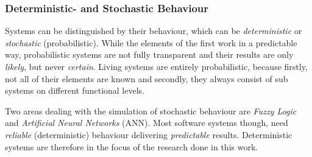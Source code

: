 %
%
%
%
%
%
%

\subsubsection{Deterministic- and Stochastic Behaviour}
\label{deterministic_and_stochastic_behaviour_heading}

Systems can be distinguished by their behaviour, which can be \emph{deterministic}
or \emph{stochastic} (probabilistic). While the elements of the first work in a
predictable way, probabilistic systems are not fully transparent and their
results are only \emph{likely}, but never \emph{certain}. Living systems are
entirely probabilistic, because firstly, not all of their elements are known
and secondly, they always consist of sub systems on different functional
levels. \cite{sengbusch}

Two areas dealing with the simulation of stochastic behaviour are \emph{Fuzzy Logic}
and \emph{Artificial Neural Networks} (ANN).
Most software systems
though, need \emph{reliable} (deterministic) behaviour delivering
\emph{predictable} results. Deterministic systems are therefore in the focus of
the research done in this work.
